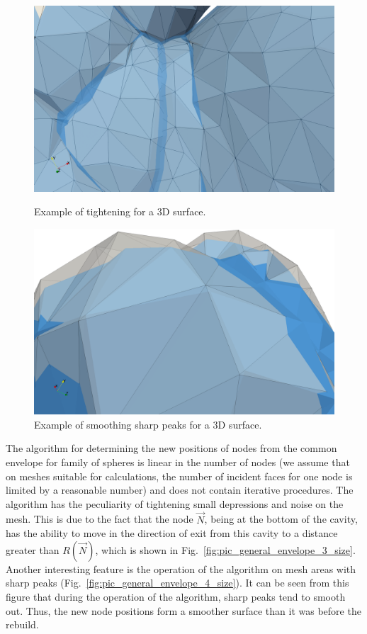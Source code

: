 \documentclass[
11pt,
tightenlines,
twoside,
onecolumn,
nofloats,
nobibnotes,
nofootinbib,
superscriptaddress,
noshowpacs,
centertags]
{revtex4-2}
\begin{document}
\begin{figure}[h]
  \centering
  \begin{minipage}[h]{0.49\textwidth}
    \includegraphics[width=\textwidth]{pics/pic_envelope_cave.png}
    \caption{Example of tightening for a 3D surface.}\label{fig:pic_general_envelope_cave}
  \end{minipage}
  \hfill
  \begin{minipage}[h]{0.49\textwidth}
    \includegraphics[width=\textwidth]{pics/pic_envelope_peak.png}
    \caption{Example of smoothing sharp peaks for a 3D surface.}\label{fig:pic_envelope_peak}
  \end{minipage}
\end{figure}

The algorithm for determining the new positions of nodes from the common envelope for family of spheres is linear in the number of nodes (we assume that on meshes suitable for calculations, the number of incident faces for one node is limited by a reasonable number) and does not contain iterative procedures.
The algorithm has the peculiarity of tightening small depressions and noise on the mesh.
This is due to the fact that the node $\vec{N}$, being at the bottom of the cavity, has the ability to move in the direction of exit from this cavity to a distance greater than $R(\vec{N})$, which is shown in Fig.~\ref{fig:pic_general_envelope_3_size}.
Another interesting feature is the operation of the algorithm on mesh areas with sharp peaks (Fig.~\ref{fig:pic_general_envelope_4_size}).
It can be seen from this figure that during the operation of the algorithm, sharp peaks tend to smooth out.
Thus, the new node positions form a smoother surface than it was before the rebuild.
\end{document}

